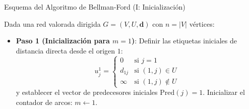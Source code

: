 \documentclass[
  ignorenonframetext,
]{beamer}
\providecommand{\tightlist}{%
  \setlength{\itemsep}{0pt}\setlength{\parskip}{0pt}}
\begin{document}
\begin{frame}{Esquema del Algoritmo de Bellman-Ford (I: Inicialización)}
\label{esquema-del-algoritmo-de-bellman-ford-i-inicializaciuxf3n}
\begin{tcolorbox}[enhanced jigsaw, colframe=quarto-callout-note-color-frame, toptitle=1mm, colback=white, colbacktitle=quarto-callout-note-color!10!white, titlerule=0mm, breakable, coltitle=black, opacityback=0, bottomrule=.15mm, title=\textcolor{quarto-callout-note-color}{\faInfo}\hspace{0.5em}{Algoritmo de Bellman-Ford --- Paso 1: Inicialización}, rightrule=.15mm, arc=.35mm, leftrule=.75mm, left=2mm, toprule=.15mm, bottomtitle=1mm, opacitybacktitle=0.6]

Dada una red valorada dirigida \(G = (V, U, \mathbf{d})\) con
\(n = |V|\) vértices:

\begin{itemize}
\tightlist
\item
  \textbf{Paso 1 (Inicialización para \(m = 1\))}: Definir las etiquetas
  iniciales de distancia directa desde el origen \(1\): \[
  u_j^1 = \begin{cases} 
  0 & \text{si } j = 1 \\ 
  d_{1j} & \text{si } (1, j) \in U \\ 
  \infty & \text{si } (1, j) \notin U 
  \end{cases}
  \] y establecer el vector de predecesores iniciales
  \(\text{Pred}(j) = 1\). Inicializar el contador de arcos:
  \(m \leftarrow 1\).
\end{itemize}

\end{tcolorbox}
\end{frame}
\end{document}
